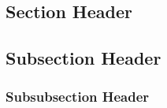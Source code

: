 \documentclass[fontsize=10pt,a4paper]{article}
\begin{document}
\begin{multicols}{3}

    \small
    \section{Section Header}
    \subsection{Subsection Header}
    \subsubsection{Subsubsection Header}

\end{multicols}
\end{document}
